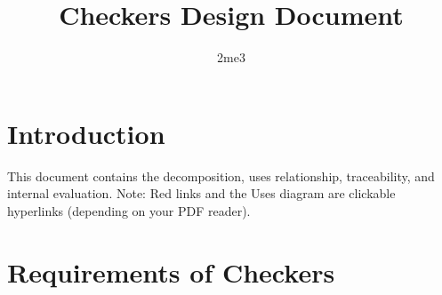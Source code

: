\documentclass[10pt]{article}
\title{\bf Checkers Design Document}
\author{2me3}
\date{}
\begin{document}
\maketitle

\tableofcontents

\section{Introduction}
    This document contains the decomposition, uses relationship, traceability, and internal evaluation.
    Note: Red links and the Uses diagram are clickable hyperlinks (depending on your PDF reader).
    
\section{Requirements of Checkers}
\end{document}
